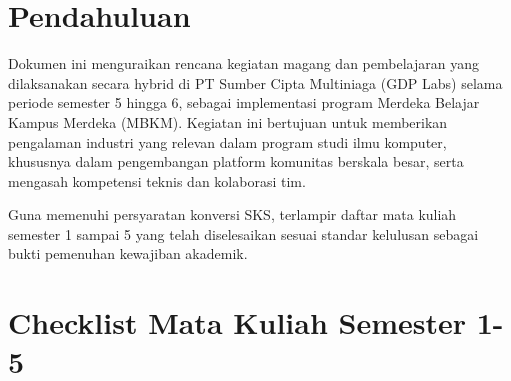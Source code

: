 \documentclass[a4paper,12pt]{article}
\begin{document}
\section{Pendahuluan}
Dokumen ini menguraikan rencana kegiatan magang dan pembelajaran yang dilaksanakan secara hybrid di PT Sumber Cipta Multiniaga (GDP Labs) selama periode semester 5 hingga 6, sebagai implementasi program Merdeka Belajar Kampus Merdeka (MBKM). Kegiatan ini bertujuan untuk memberikan pengalaman industri yang relevan dalam program studi ilmu komputer, khususnya dalam pengembangan platform komunitas berskala besar, serta mengasah kompetensi teknis dan kolaborasi tim.

Guna memenuhi persyaratan konversi SKS, terlampir daftar mata kuliah semester 1 sampai 5 yang telah diselesaikan sesuai standar kelulusan sebagai bukti pemenuhan kewajiban akademik.

\section{Checklist Mata Kuliah Semester 1-5}
\end{document}
